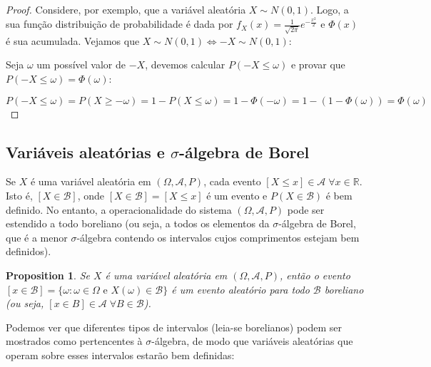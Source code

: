 \documentclass[
]{article}
\newtheorem{proposition}{Proposition}[section]
\theoremstyle{definition}
\theoremstyle{definition}
\theoremstyle{definition}
\theoremstyle{definition}
\theoremstyle{remark}
\begin{document}
\begin{proof}
Considere, por exemplo, que a variável aleatória \(X \sim N(0,1)\). Logo, a sua função distribuição de probabilidade é dada por \(f_{X}(x) = \frac{1}{\sqrt{2\pi}}e^{-\frac{x^{2}}{2}}\) e \(\Phi(x)\) é sua acumulada. Vejamos que \(X \sim N(0,1) \Longleftrightarrow -X \sim N(0,1)\):

Seja \(\omega\) um possível valor de \(-X\), devemos calcular \(P(-X \le \omega)\) e provar que \(P(-X \le \omega) = \Phi(\omega)\):

\begin{equation*}
P(-X \le \omega) = P(X \ge -\omega) = 1 - P(X \le \omega) = 1 - \Phi(-\omega) = 1 - (1 - \Phi(\omega)) = \Phi(\omega)
\end{equation*}
\end{proof}

\hypertarget{variuxe1veis-aleatuxf3rias-e-sigma-uxe1lgebra-de-borel}{%
\subsection{\texorpdfstring{Variáveis aleatórias e \(\sigma\)-álgebra de Borel}{Variáveis aleatórias e \textbackslash sigma-álgebra de Borel}}\label{variuxe1veis-aleatuxf3rias-e-sigma-uxe1lgebra-de-borel}}

Se \(X\) é uma variável aleatória em \((\Omega, \mathcal{A}, P)\), cada evento \([X \le x] \in \mathcal{A} \; \forall x \in \mathbb{R}\). Isto é, \([X \in \mathcal{B}]\), onde \([X \in \mathcal{B}] = [X \le x]\) é um evento e \(P(X \in \mathcal{B})\) é bem definido. No entanto, a operacionalidade do sistema \((\Omega, \mathcal{A},P)\) pode ser estendido a todo boreliano (ou seja, a todos os elementos da \(\sigma\)-álgebra de Borel, que é a menor \(\sigma\)-álgebra contendo os intervalos cujos comprimentos estejam bem definidos).

\begin{proposition}
Se \(X\) é uma variável aleatória em \((\Omega,\mathcal{A},P)\), então o evento \([x \in \mathcal{B}] = \{\omega : \omega \in \Omega \text{ e } X(\omega) \in \mathcal{B}\}\) é um evento aleatório para todo \(\mathcal{B}\) boreliano (ou seja, \([x \in B] \in \mathcal{A} \; \forall B \in \mathcal{B}\)).
\end{proposition}

Podemos ver que diferentes tipos de intervalos (leia-se borelianos) podem ser mostrados como pertencentes à \(\sigma\)-álgebra, de modo que variáveis aleatórias que operam sobre esses intervalos estarão bem definidas:
\end{document}
